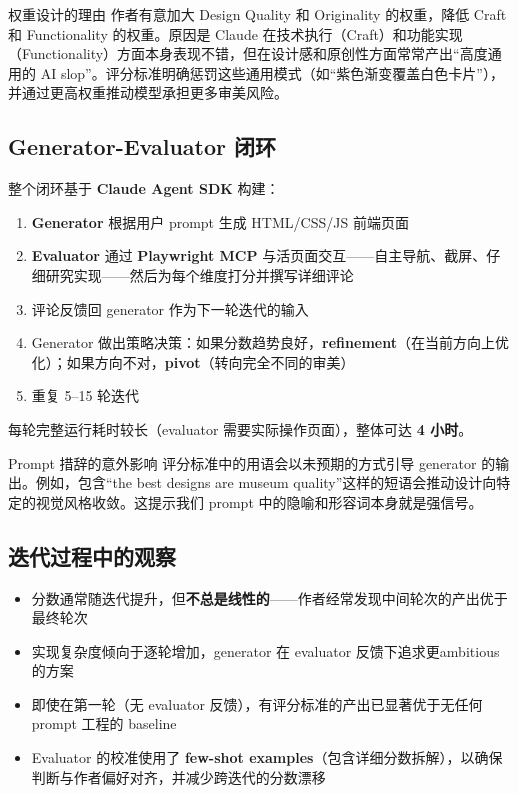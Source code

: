 \documentclass[a4paper]{article}
\begin{document}
\begin{importantbox}{权重设计的理由}
作者有意加大 Design Quality 和 Originality 的权重，降低 Craft 和 Functionality 的权重。原因是 Claude 在技术执行（Craft）和功能实现（Functionality）方面本身表现不错，但在设计感和原创性方面常常产出``高度通用的 AI slop''。评分标准明确惩罚这些通用模式（如``紫色渐变覆盖白色卡片''），并通过更高权重推动模型承担更多审美风险。
\end{importantbox}

\subsection{Generator-Evaluator 闭环}

整个闭环基于 \textbf{Claude Agent SDK} 构建：

\begin{enumerate}
    \item \textbf{Generator} 根据用户 prompt 生成 HTML/CSS/JS 前端页面
    \item \textbf{Evaluator} 通过 \textbf{Playwright MCP} 与活页面交互——自主导航、截屏、仔细研究实现——然后为每个维度打分并撰写详细评论
    \item 评论反馈回 generator 作为下一轮迭代的输入
    \item Generator 做出策略决策：如果分数趋势良好，\textbf{refinement}（在当前方向上优化）；如果方向不对，\textbf{pivot}（转向完全不同的审美）
    \item 重复 5--15 轮迭代
\end{enumerate}

每轮完整运行耗时较长（evaluator 需要实际操作页面），整体可达 \textbf{4 小时}。

\begin{warningbox}{Prompt 措辞的意外影响}
评分标准中的用语会以未预期的方式引导 generator 的输出。例如，包含``the best designs are museum quality''这样的短语会推动设计向特定的视觉风格收敛。这提示我们 prompt 中的隐喻和形容词本身就是强信号。
\end{warningbox}

\subsection{迭代过程中的观察}

\begin{itemize}
    \item 分数通常随迭代提升，但\textbf{不总是线性的}——作者经常发现中间轮次的产出优于最终轮次
    \item 实现复杂度倾向于逐轮增加，generator 在 evaluator 反馈下追求更ambitious 的方案
    \item 即使在第一轮（无 evaluator 反馈），有评分标准的产出已显著优于无任何 prompt 工程的 baseline
    \item Evaluator 的校准使用了 \textbf{few-shot examples}（包含详细分数拆解），以确保判断与作者偏好对齐，并减少跨迭代的分数漂移
\end{itemize}
\end{document}
